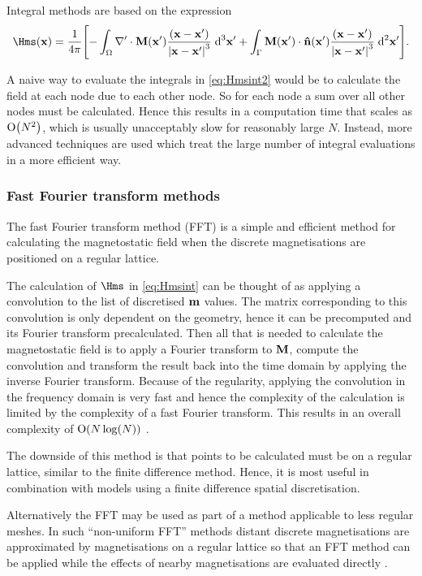 Integral methods are based on the expression
\begin{equation}
  \Hms(\xv) = \frac{1}{4 \pi} \bigs{
    - \int_\magd \nabla' \cdot \Mv(\xv') \frac{(\xv - \xv')}{\abs{\xv -\xv'}^3} \d^3 \xv'
    + \int_\boundd \Mv(\xv') \cdot \nv(\xv') \frac{(\xv - \xv')}{\abs{\xv - \xv'}^3} \d^2 \xv' }.
  \label{eq:Hmsint2}
\end{equation}

A naive way to evaluate the integrals in \cref{eq:Hmsint2} would be to calculate the field at each node due to each other node.
So for each node a sum over all other nodes must be calculated.
Hence this results in a computation time that scales as $\mathrm{O}{\left( N^2 \right)}$, which is usually unacceptably slow for reasonably large $N$.
Instead, more advanced techniques are used which treat the large number of integral evaluations in a more efficient way.


\subsubsection{Fast Fourier transform methods}

The fast Fourier transform method (FFT) is a simple and efficient method for calculating the magnetostatic field when the discrete magnetisations are positioned on a regular lattice.

The calculation of $\Hms$ in \cref{eq:Hmsint} can be thought of as applying a convolution to the list of discretised $\boldsymbol{\mathrm{m}}$ values.
The matrix corresponding to this convolution is only dependent on the geometry, hence it can be precomputed and its Fourier transform precalculated.
Then all that is needed to calculate the magnetostatic field is to apply a Fourier transform to $\boldsymbol{\mathrm{M}}$, compute the convolution and transform the result back into the time domain by applying the inverse Fourier transform.
Because of the regularity, applying the convolution in the frequency domain is very fast and hence the complexity of the calculation is limited by the complexity of a fast Fourier transform.
This results in an overall complexity of $\mathrm{O}{\left( N \log(N) \right)}$ \cite{Jones1997}.

The downside of this method is that points to be calculated must be on a regular lattice, similar to the finite difference method.
Hence, it is most useful in combination with models using a finite difference spatial discretisation.

Alternatively the FFT may be used as part of a method applicable to less regular meshes.
In such ``non-uniform FFT'' methods distant discrete magnetisations are approximated by magnetisations on a regular lattice so that an FFT method can be applied while the effects of nearby magnetisations are evaluated directly \cite{Jones1997}.


